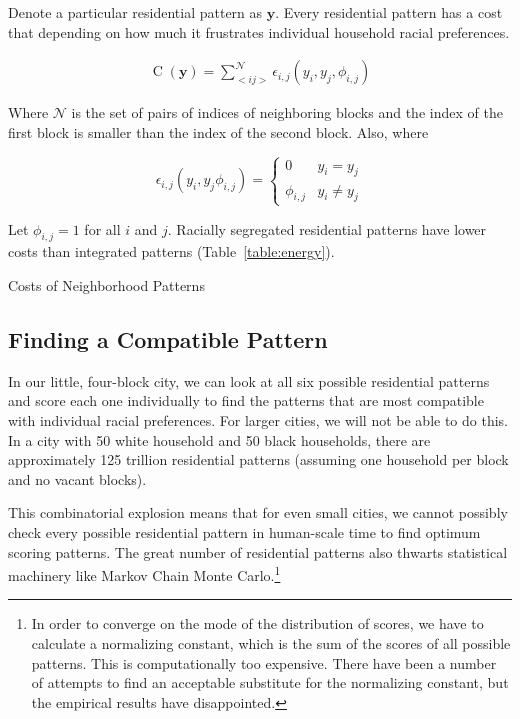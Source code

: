 Denote a particular residential pattern as $\mathbf{y}$.  Every 
residential pattern has a cost that depending on how much it
frustrates individual household racial preferences. 

\begin{align}
\operatorname{C}(\mathbf{y}) = \sum_{<i j>}^{\mathcal{N}}\epsilon_{i,j}(y_i,y_j,\phi_{i,j})
\end{align}

Where $\mathcal{N}$ is the set of pairs of indices of neighboring
blocks and the index of the first block is smaller than the index of
the second block. Also, where

\begin{equation}
  \epsilon_{i,j}(y_i,y_j\phi_{i,j}) = \begin{cases}
    0  &y_i = y_j \\
    \phi_{i,j}  &y_i \neq y_j
  \end{cases}
\end{equation}

Let $\phi_{i,j}=1$ for all $i$ and $j$. Racially segregated
residential patterns have lower costs than integrated patterns
(Table~\ref{table:energy}).

\begin{table}[h]

\caption{Costs of Neighborhood Patterns}
\label{table:energy}
\end{table}

\subsection*{Finding a Compatible Pattern}
In our little, four-block city, we can look at all six possible
residential patterns and score each one individually to find the
patterns that are most compatible with individual racial
preferences. For larger cities, we will not be able to do this. In a
city with 50 white household and 50 black households, there are
approximately 125 trillion residential patterns (assuming one
household per block and no vacant blocks).

This combinatorial explosion means that for even small cities, we
cannot possibly check every possible residential pattern in
human-scale time to find optimum scoring patterns. The great number of
residential patterns also thwarts statistical machinery like Markov
Chain Monte Carlo.\footnote{In order to converge on the mode of the
  distribution of scores, we have to calculate a normalizing constant,
  which is the sum of the scores of all possible patterns. This is
  computationally too expensive. There have been a number of attempts
  to find an acceptable substitute for the normalizing constant, but
  the empirical results have disappointed.\cite{li_mrf_2009}}

